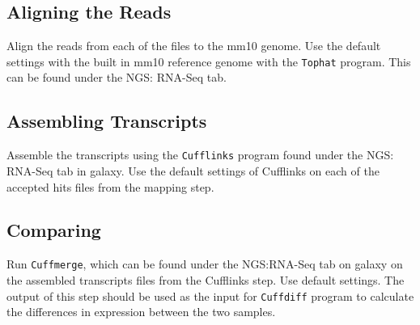 \documentclass{report}
\begin{document}
\subsection{Aligning the Reads}
Align the reads from each of the files to the mm10 genome. Use the default settings with the built in mm10 reference genome with the \texttt{Tophat} program. This can be found under the NGS: RNA-Seq tab.

\subsection{Assembling Transcripts}
Assemble the transcripts using the \texttt{Cufflinks} program found under the NGS: RNA-Seq tab in galaxy. Use the default settings of Cufflinks on each of the accepted hits files from the mapping step.

\subsection{Comparing}
Run \texttt{Cuffmerge}, which can be found under the NGS:RNA-Seq tab on galaxy on the assembled transcripts files from the Cufflinks step. Use default settings. The output of this step should be used as the input for \texttt{Cuffdiff} program to calculate the differences in expression between the two samples. 


\end{document}
